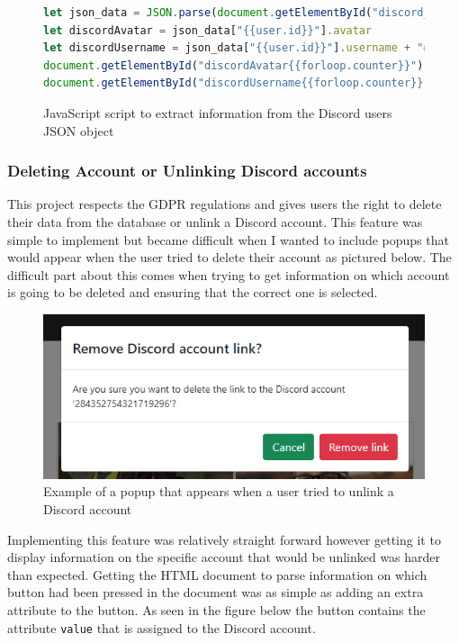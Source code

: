 \begin{figure}[H]
\begin{lstlisting}[language=JavaScript]
let json_data = JSON.parse(document.getElementById("discord_user_info").textContent)
let discordAvatar = json_data["{{user.id}}"].avatar
let discordUsername = json_data["{{user.id}}"].username + "#" + json_data["{{user.id}}"].discriminator
document.getElementById("discordAvatar{{forloop.counter}}").src = `https://cdn.discordapp.com/avatars/{{user.id}}/${discordAvatar}.png?size=256`
document.getElementById("discordUsername{{forloop.counter}}").textContent = `${discordUsername}`
\end{lstlisting}
\caption{JavaScript script to extract information from the Discord users JSON object}
\label{fig:django-api-dis}
\end{figure}

\subsubsection{Deleting Account or Unlinking Discord accounts}
This project respects the GDPR regulations and gives users the right to delete their data from the database or unlink a Discord account. This feature was simple to implement but became difficult when I wanted to include popups that would appear when the user tried to delete their account as pictured below. The difficult part about this comes when trying to get information on which account is going to be deleted and ensuring that the correct one is selected.

\begin{figure}[H]
	\centering
	\includegraphics[width=1\textwidth]{Figures/website-discord-modal.png}
	\caption{Example of a popup that appears when a user tried to unlink a Discord account}
	\label{fig:django-modal}
\end{figure}

Implementing this feature was relatively straight forward however getting it to display information on the specific account that would be unlinked was harder than expected. Getting the HTML document to parse information on which button had been pressed in the document was as simple as adding an extra attribute to the button. As seen in the figure below the button contains the attribute \verb|value| that is assigned to the Discord account.


